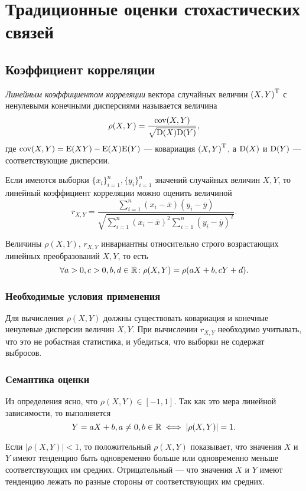 \section*{Традиционные оценки стохастических связей}
\subsection*{Коэффициент корреляции}

\begin{define}
\emph{Линейным коэффициентом корреляции} вектора случайных величин ${(X, Y)}^\mathrm{T}$ с ненулевыми конечными дисперсиями называется величина
\begin{equation}
	\rho(X, Y) = \frac{\mathrm{cov}(X, Y)}{\sqrt{\mathrm{D}(X)\mathrm{D}(Y)}},
\end{equation}
где $\mathrm{cov}(X, Y) = \mathrm{E}(XY) - \mathrm{E}(X)\mathrm{E}(Y)$ --- ковариация ${(X, Y)}^\mathrm{T}$, а $\mathrm{D}(X)$ и $\mathrm{D}(Y)$ --- соответствующие дисперсии.
\end{define}

Если имеются выборки $\{x_i\}_{i=1}^n, \{y_i\}_{i=1}^n$ значений случайных величин $X, Y$, то линейный коэффициент корреляции можно оценить величиной
\begin{equation}
r_{X, Y} = \frac{\sum_{i=1}^{n} (x_i - \overline{x})(y_i - \overline{y})}{\sqrt{\sum_{i=1}^{n} (x_i - \overline{x})^2 \sum_{i=1}^{n} (y_i - \overline{y})^2}}.
\end{equation}

Величины $\rho(X, Y)$, $r_{X, Y}$ инвариантны относительно строго возрастающих линейных преобразований $X, Y$, то есть
\[
\forall a > 0, c > 0, b, d \in \mathbb{R} \colon \rho(X, Y) = \rho(aX + b, cY + d).
\]

\subsubsection*{Необходимые условия применения}
Для вычисления $\rho(X, Y)$ должны существовать ковариация и конечные ненулевые дисперсии величин $X, Y$. При вычислении $r_{X, Y}$ необходимо учитывать, что это не робастная статистика, и убедиться, что выборки не содержат выбросов.
\subsubsection*{Семантика оценки}
Из определения ясно, что $\rho(X, Y) \in [-1, 1]$. Так как это мера линейной зависимости, то выполняется
\[
Y = aX + b, a \neq 0, b \in \mathbb{R} \iff |\rho(X, Y)| = 1.
\]

Если $|\rho(X, Y)| < 1$, то положительный $\rho(X, Y)$ показывает, что значения $X$ и $Y$ имеют тенденцию быть одновременно больше или одновременно меньше соответствующих им средних. Отрицательный --- что значения $X$ и $Y$ имеют тенденцию лежать по разные стороны от соответствующих им средних.

